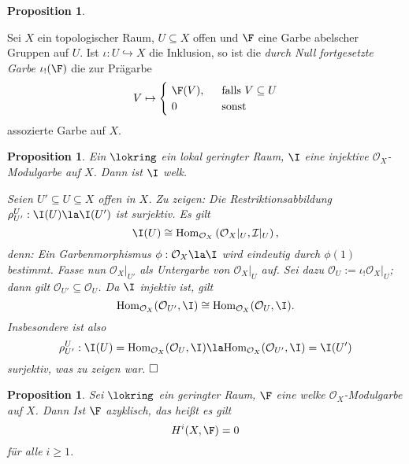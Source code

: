 \documentclass[11pt]{book}
\newtheorem{proposition}[theorem]{Proposition}
\theoremstyle{nonumberbreak}
\newenvironment{defin}[1][]{\ifthenelse{\equal{#1}{}}{\definition}{\definition[#1]}\rm}{\enddefinition}
\newenvironment{pr}[1][]{\ifthenelse{\equal{#1}{}}{\proof}{\proof[#1]}\rm}{\endproof}
\newcommand{\Hom}{\mathrm{Hom} }
\begin{document}
\begin{spacing}{1.4}
\begin{proposition}
\begin{pr}
\end{pr}

\end{proposition}



\begin{defin}  %
Sei $X$ ein topologischer Raum, $U \subseteq X$ offen und $\F$ eine Garbe abelscher Gruppen auf $U$. Ist $\iota: U \hookrightarrow X$ die Inklusion, so ist die \textit{durch Null fortgesetzte Garbe} $\iota_{!}(\F)$ die zur Prägarbe
$$V \mapsto \begin{cases} \ \F(V), & \ \textrm{ falls } V \subseteq U \\ \ 0 & \ \textrm{ sonst } \end{cases}$$
assozierte Garbe auf $X$.
\end{defin}


\begin{proposition}   %
Ein $\lokring$ ein lokal geringter Raum, $\I$ eine injektive $\mathcal{O}_X$-Modulgarbe auf $X$. Dann ist $\I$ welk.

\begin{pr}
Seien $U' \subseteq U \subseteq X$ offen in $X$. Zu zeigen: Die Restriktionsabbildung $\rho^{U}_{U'}: \I(U) \la \I(U')$ ist surjektiv. Es gilt 
$$\I(U) \cong \Hom_{\mathcal{O}_X}\left( \mathcal{O}_X \vert_U, \mathcal{I}\vert_U \right),$$
denn: Ein Garbenmorphismus $\phi: \mathcal{O}_X \la \I$ wird eindeutig durch $\phi(1)$ bestimmt. Fasse nun $\mathcal{O}_X\vert_{U'}$ als Untergarbe von $\mathcal{O}_X\vert_U$ auf. Sei dazu $\mathcal{O}_U := \iota_{!}\mathcal{O}_X \vert_U$; dann gilt $\mathcal{O}_{U'} \subseteq \mathcal{O}_U$. Da $\I$ injektiv ist, gilt
$$\Hom_{\mathcal{O}_X} (\mathcal{O}_{U'}, \I) \cong \Hom_{\mathcal{O}_X}(\mathcal{O}_U, \I).$$
Insbesondere ist also 
$$\rho^{U}_{U'}: \I(U) = \Hom_{\mathcal{O}_X}(\mathcal{O}_U, \I) \la \Hom_{\mathcal{O}_X}(\mathcal{O}_{U'}, \I ) = \I(U')$$
surjektiv, was zu zeigen war. $\hfill \Box$


\end{pr}

\end{proposition}



\begin{proposition} %
Sei $\lokring$ ein geringter Raum, $\F$ eine welke $\mathcal{O}_X$-Modulgarbe auf $X$. Dann Ist $\F$ azyklisch, das heißt es gilt 
$$H^{i}(X,\F) = 0$$
für alle $i \geqslant 1$. 


\end{proposition}
\end{spacing}
\end{document}
